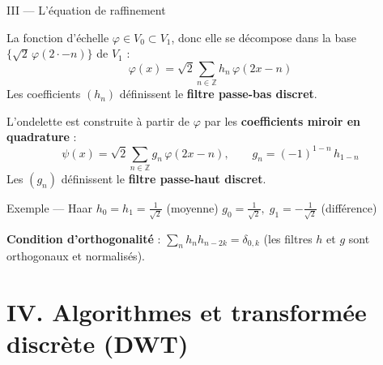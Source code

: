 \documentclass[10pt]{beamer}
\newcommand{\ZZ}{\mathbb{Z}}
\begin{document}
	\begin{frame}{III — L'équation de raffinement}
		
		La fonction d'échelle $\varphi \in V_0 \subset V_1$, donc elle se décompose
		dans la base $\{\sqrt{2}\,\varphi(2\cdot - n)\}$ de $V_1$ :
		\[
		\boxed{\varphi(x) = \sqrt{2} \sum_{n \in \ZZ} h_n\, \varphi(2x - n)}
		\]
		Les coefficients $(h_n)$ définissent le \textbf{filtre passe-bas discret}.
		
		\medskip
		L'ondelette est construite à partir de $\varphi$ par les
		\textbf{coefficients miroir en quadrature} :
		\[
		\boxed{\psi(x) = \sqrt{2} \sum_{n \in \ZZ} g_n\, \varphi(2x - n),}
		\qquad
		g_n = (-1)^{1-n}\, h_{1-n}
		\]
		Les $(g_n)$ définissent le \textbf{filtre passe-haut discret}.
		
		\medskip
		\begin{block}{Exemple — Haar}
			$h_0 = h_1 = \tfrac{1}{\sqrt{2}}$ \quad (moyenne) \qquad
			$g_0 = \tfrac{1}{\sqrt{2}},\; g_1 = -\tfrac{1}{\sqrt{2}}$ \quad (différence)
		\end{block}
		
		\medskip
		\textbf{Condition d'orthogonalité} : $\sum_n h_n h_{n-2k} = \delta_{0,k}$
		(les filtres $h$ et $g$ sont orthogonaux et normalisés).
		
	\end{frame}
	
	\section{IV. Algorithmes et transformée discrète (DWT)}
	
\end{document}
